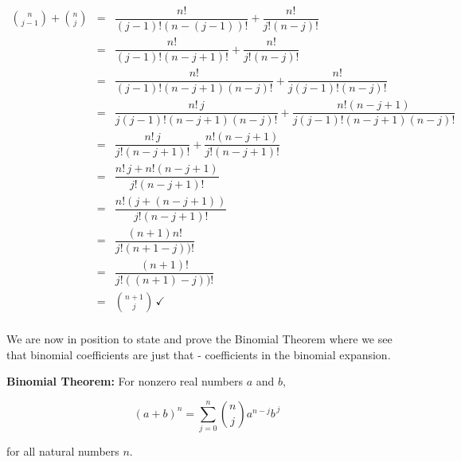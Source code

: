\documentclass{ximera}
\begin{document}
\[ \begin{array}{rcl}

\displaystyle{\binom{n}{j-1} + \binom{n}{j}} & = & \dfrac{n!}{(j-1)! (n-(j-1))!} + \dfrac{n!}{j! (n-j)!}  \\ [15pt]

& = & \dfrac{n!}{(j-1)! (n-j+1)!} + \dfrac{n!}{j! (n-j)!}  \\ [15pt]

& = & \dfrac{n!}{(j-1)! (n-j+1)(n-j)!} + \dfrac{n!}{j(j-1)! (n-j)!}  \\ [15pt]

& = & \dfrac{n! \, j}{j(j-1)! (n-j+1)(n-j)!} + \dfrac{n! (n-j+1)}{j(j-1)! (n-j+1)(n-j)!} \\ [15pt]

& = & \dfrac{n! \, j}{j! (n-j+1)!} + \dfrac{n! (n-j+1)}{j! (n-j+1)!} \\ [15pt]

& = & \dfrac{n! \, j + n! (n-j+1)}{j! (n-j+1)!} \\ [15pt]

& = & \dfrac{n!\left( j + (n-j+1)\right)}{j! (n-j+1)!} \\ [15pt]

& = & \dfrac{(n+1) n!}{j! (n+1-j))!} \\ [15pt] 

& = & \dfrac{(n+1)!} {j! ((n+1)-j))!} \\ [15pt]

& = & \displaystyle{\binom{n+1}{j}} \, \checkmark \\ 

\end{array} \]

We are now in position to state and prove the Binomial Theorem where we see that binomial coefficients are just that - coefficients in the binomial expansion.

\smallskip

\colorbox{ResultColor}{\bbm

\begin{thm}  \label{BinomialTheorem}  \textbf{Binomial Theorem:}  For nonzero real numbers $a$ and $b$,

\[(a+b)^{n} =\displaystyle{\sum_{j=0}^{n} \binom{n}{j} a^{n-j} b^{\, j}} \]

for all natural numbers $n$.

\end{thm}

\ebm}

\smallskip
\end{document}
